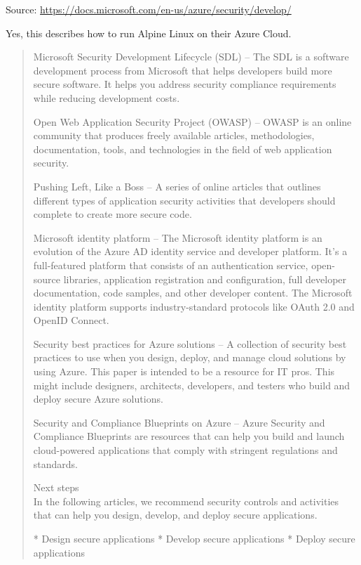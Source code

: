 \documentclass[Screen16to9,17pt]{foils}
\begin{document}
Source:
\url{https://docs.microsoft.com/en-us/azure/security/develop/}

Yes, this describes how to run Alpine Linux on their Azure Cloud.




\begin{quote}\footnotesize
Microsoft Security Development Lifecycle (SDL) – The SDL is a software development process from Microsoft that helps developers build more secure software. It helps you address security compliance requirements while reducing development costs.

Open Web Application Security Project (OWASP) – OWASP is an online community that produces freely available articles, methodologies, documentation, tools, and technologies in the field of web application security.

Pushing Left, Like a Boss – A series of online articles that outlines different types of application security activities that developers should complete to create more secure code.

Microsoft identity platform – The Microsoft identity platform is an evolution of the Azure AD identity service and developer platform. It’s a full-featured platform that consists of an authentication service, open-source libraries, application registration and configuration, full developer documentation, code samples, and other developer content. The Microsoft identity platform supports industry-standard protocols like OAuth 2.0 and OpenID Connect.

Security best practices for Azure solutions – A collection of security best practices to use when you design, deploy, and manage cloud solutions by using Azure. This paper is intended to be a resource for IT pros. This might include designers, architects, developers, and testers who build and deploy secure Azure solutions.

Security and Compliance Blueprints on Azure – Azure Security and Compliance Blueprints are resources that can help you build and launch cloud-powered applications that comply with stringent regulations and standards.

Next steps\\
In the following articles, we recommend security controls and activities that can help you design, develop, and deploy secure applications.

* Design secure applications
* Develop secure applications
* Deploy secure applications
\end{quote}
\end{document}
